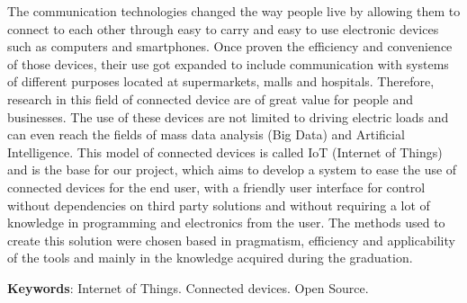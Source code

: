 \documentclass[../../layout.tex]{subfiles}
\begin{document}
\begin{resumo}[Abstract]
\hspace*{3em}
The communication technologies changed the way people live by allowing them to connect to each other through easy to carry and easy to use electronic devices such as computers and smartphones.
Once proven the efficiency and convenience of those devices, their use got expanded to include communication with systems of different purposes located at supermarkets, malls and hospitals.
Therefore, research in this field of connected device are of great value for people and businesses.
The use of these devices are not limited to driving electric loads and can even reach the fields of mass data analysis (Big Data) and Artificial Intelligence.
This model of connected devices is called IoT (Internet of Things) and is the base for our project, which aims to develop a system to ease the use of connected devices for the end user, with a friendly user interface for control without dependencies on third party solutions and without requiring a lot of knowledge in programming and electronics from the user.
The methods used to create this solution were chosen based in pragmatism, efficiency and applicability of the tools and mainly in the knowledge acquired during the graduation.
\vspace{\onelineskip}

\noindent
\textbf{Keywords}: Internet of Things. Connected devices. Open Source.
\end{resumo}
\end{document}
